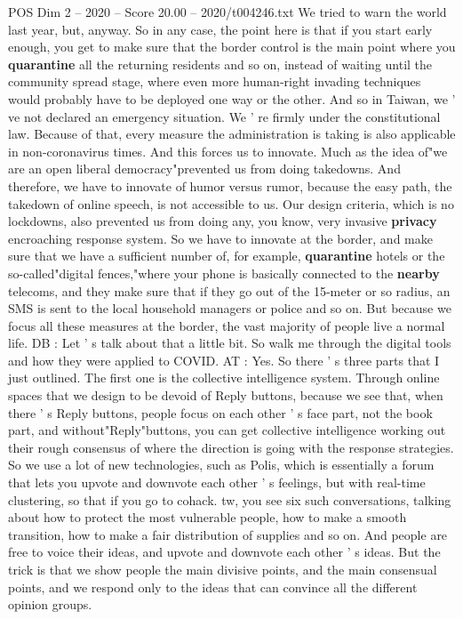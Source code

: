 \begin{textsample}{POS Dim 2 – 2020 – Score 20.00 – 2020/t004246.txt}
We tried to warn the world last year, but, anyway.
So in any case, the point here is that if you start early enough, you get to make sure that the border control is the main point where you \textbf{quarantine} all the returning residents and so on, instead of waiting until the community spread stage, where even more human-right invading techniques would probably have to be deployed one way or the other.
And so in Taiwan, we ' ve not declared an emergency situation.
We ' re firmly under the constitutional law.
Because of that, every measure the administration is taking is also applicable in non-coronavirus times.
And this forces us to innovate.
Much as the idea of"we are an open liberal democracy"prevented us from doing takedowns.
And therefore, we have to innovate of humor versus rumor, because the easy path, the takedown of online speech, is not accessible to us.
Our design criteria, which is no lockdowns, also prevented us from doing any, you know, very invasive \textbf{privacy} encroaching response system.
So we have to innovate at the border, and make sure that we have a sufficient number of, for example, \textbf{quarantine} hotels or the so-called"digital fences,"where your phone is basically connected to the \textbf{nearby} telecoms, and they make sure that if they go out of the 15-meter or so radius, an SMS is sent to the local household managers or police and so on.
But because we focus all these measures at the border, the vast majority of people live a normal life.
DB : Let ' s talk about that a little bit.
So walk me through the digital tools and how they were applied to COVID.
AT : Yes.
So there ' s three parts that I just outlined.
The first one is the collective intelligence system.
Through online spaces that we design to be devoid of Reply buttons, because we see that, when there ' s Reply buttons, people focus on each other ' s face part, not the book part, and without"Reply"buttons, you can get collective intelligence working out their rough consensus of where the direction is going with the response strategies.
So we use a lot of new technologies, such as Polis, which is essentially a forum that lets you upvote and downvote each other ' s feelings, but with real-time clustering, so that if you go to cohack. tw, you see six such conversations, talking about how to protect the most vulnerable people, how to make a smooth transition, how to make a fair distribution of supplies and so on.
And people are free to voice their ideas, and upvote and downvote each other ' s ideas.
But the trick is that we show people the main divisive points, and the main consensual points, and we respond only to the ideas that can convince all the different opinion groups.

\end{textsample}
